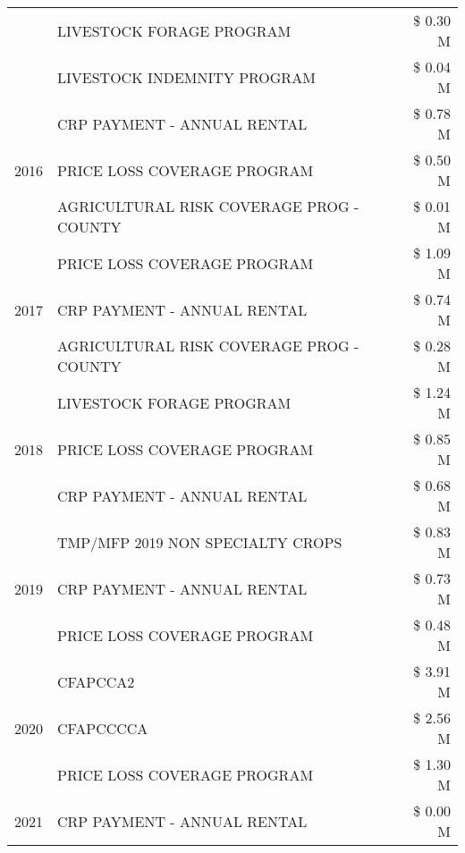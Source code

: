 \begin{tabular}{llr}
 & LIVESTOCK FORAGE PROGRAM & \$ 0.30 M \\
 & LIVESTOCK INDEMNITY PROGRAM & \$ 0.04 M \\
\cline{1-3}
\multirow[t]{3}{*}{2016} & CRP PAYMENT - ANNUAL RENTAL & \$ 0.78 M \\
 & PRICE LOSS COVERAGE PROGRAM & \$ 0.50 M \\
 & AGRICULTURAL RISK COVERAGE PROG - COUNTY & \$ 0.01 M \\
\cline{1-3}
\multirow[t]{3}{*}{2017} & PRICE LOSS COVERAGE PROGRAM & \$ 1.09 M \\
 & CRP PAYMENT - ANNUAL RENTAL & \$ 0.74 M \\
 & AGRICULTURAL RISK COVERAGE PROG - COUNTY & \$ 0.28 M \\
\cline{1-3}
\multirow[t]{3}{*}{2018} & LIVESTOCK FORAGE PROGRAM & \$ 1.24 M \\
 & PRICE LOSS COVERAGE PROGRAM & \$ 0.85 M \\
 & CRP PAYMENT - ANNUAL RENTAL & \$ 0.68 M \\
\cline{1-3}
\multirow[t]{3}{*}{2019} & TMP/MFP 2019 NON SPECIALTY CROPS & \$ 0.83 M \\
 & CRP PAYMENT - ANNUAL RENTAL & \$ 0.73 M \\
 & PRICE LOSS COVERAGE PROGRAM & \$ 0.48 M \\
\cline{1-3}
\multirow[t]{3}{*}{2020} & CFAPCCA2 & \$ 3.91 M \\
 & CFAPCCCCA & \$ 2.56 M \\
 & PRICE LOSS COVERAGE PROGRAM & \$ 1.30 M \\
\cline{1-3}
2021 & CRP PAYMENT - ANNUAL RENTAL & \$ 0.00 M \\
\cline{1-3}
\bottomrule
\end{tabular}
